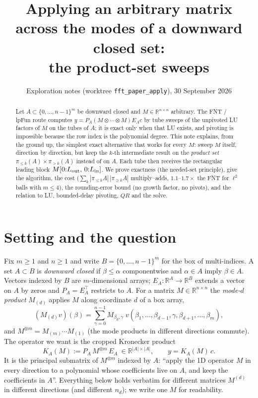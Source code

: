 \documentclass[11pt]{article}
\title{Applying an arbitrary matrix across the modes of a downward closed set:\\ the product-set sweeps}
\author{Exploration notes (worktree \texttt{fft\_paper\_apply}), 30 September 2026}
\date{}
\newcommand{\R}{\mathbb{R}}\newcommand{\N}{\mathbb{N}}
\newcommand{\PA}{P_{\!A}}\newcommand{\EA}{E_{A}}\newcommand{\KA}{K_{\!A}}
\newcommand{\pr}[1]{\pi_{#1}}
\begin{document}
\maketitle
\begin{abstract}
Let $A\subset\{0,\dots,n-1\}^m$ be downward closed and $M\in\R^{n\times n}$ arbitrary. The FNT / lpFun
route computes $y=\PA(M\otimes\cdots\otimes M)\EA c$ by tube sweeps of the unpivoted LU factors of $M$ on the
tubes of $A$; it is exact only when that LU exists, and pivoting is impossible because the row index is the
polynomial degree. This note explains, from the ground up, the simplest exact alternative that works for every
$M$: sweep $M$ itself, direction by direction, but keep the $k$-th intermediate result on the
\emph{product set} $\pr{\le k}(A)\times\pr{>k}(A)$ instead of on $A$. Each tube then receives the rectangular
leading block $M[0{:}L_{\rm out},\,0{:}L_{\rm in}]$. We prove exactness (the needed-set principle), give the
algorithm, the cost ($\sum_k|\pr{\le k}A|\,|\pr{\ge k}A|$ multiply--adds, $1.1$--$1.7\times$ the FNT for $\ell^2$ balls
with $m\le4$), the rounding-error bound (no growth factor, no pivots), and the relation to LU, bounded-delay
pivoting, $QR$ and the solve.
\end{abstract}

\section{Setting and the question}
Fix $m\ge1$ and $n\ge1$ and write $B=\{0,\dots,n-1\}^m$ for the box of multi-indices. A set $A\subset B$ is
\emph{downward closed} if $\beta\le\alpha$ componentwise and $\alpha\in A$ imply $\beta\in A$. Vectors indexed by
$B$ are $m$-dimensional arrays; $\EA:\R^{A}\to\R^{B}$ extends a vector on $A$ by zeros and $\PA=\EA^{\!\top}$
restricts to $A$. For a matrix $M\in\R^{n\times n}$ the \emph{mode-$d$ product} $M_{(d)}$ applies $M$ along
coordinate $d$ of a box array,
\[
 (M_{(d)}v)(\beta)=\sum_{\gamma=0}^{n-1} M_{\beta_d,\gamma}\; v(\beta_1,\dots,\beta_{d-1},\gamma,\beta_{d+1},\dots,\beta_m),
\]
and $M^{\otimes m}=M_{(m)}\cdots M_{(1)}$ (the mode products in different directions commute). The operator we
want is the cropped Kronecker product
\begin{equation}\label{eq:KA}
 \KA(M):=\PA\,M^{\otimes m}\,\EA\ \in\R^{|A|\times|A|},\qquad y=\KA(M)\,c .
\end{equation}
It is the principal submatrix of $M^{\otimes m}$ indexed by $A$: ``apply the 1D operator $M$ in every direction
to a polynomial whose coefficients live on $A$, and keep the coefficients in $A$''. Everything below holds
verbatim for different matrices $M^{(d)}$ in different directions (and different $n_d$); we write one $M$ for
readability.
\end{document}
